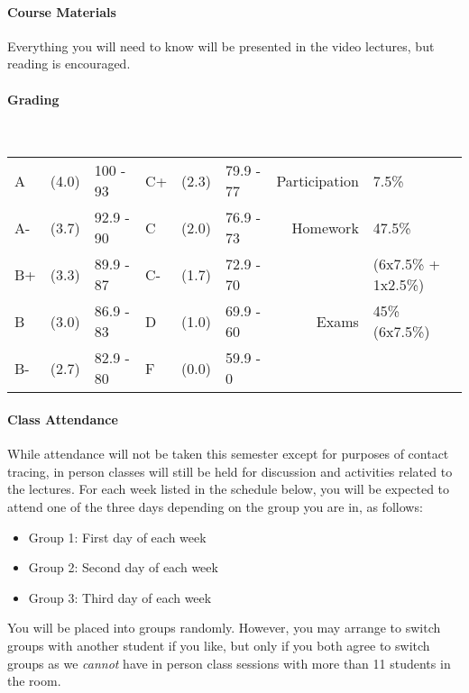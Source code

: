 \documentclass{article}
\begin{document}
  \paragraph{Course Materials}
    Everything you will need to know will be presented in the video lectures, but reading is encouraged.

  \paragraph{Grading} \mbox{}\\
    {\small
      \begin{tabular}{@{} l @{} l l l @{} l l | r l @{}}
        A   & (4.0) & 100 - 93  & C+  & (2.3) & 79.9 - 77 & Participation & 7.5\%\\
        A-  & (3.7) & 92.9 - 90 & C   & (2.0) & 76.9 - 73 & Homework      & 47.5\%\\
        B+  & (3.3) & 89.9 - 87 & C-  & (1.7) & 72.9 - 70 &               & (6x7.5\% + 1x2.5\%)\\
        B   & (3.0) & 86.9 - 83 & D   & (1.0) & 69.9 - 60 & Exams         & 45\% (6x7.5\%)\\
        B-  & (2.7) & 82.9 - 80 & F   & (0.0) & 59.9 - 0  &               &
      \end{tabular}
    }

  \paragraph{Class Attendance}
    While attendance will not be taken this semester except for purposes of contact tracing, in person classes will still be held for discussion and activities related to the lectures.
    For each week listed in the schedule below, you will be expected to attend one of the three days depending on the group you are in, as follows:
    \begin{itemize}
      \item Group 1: First day of each week
      \item Group 2: Second day of each week
      \item Group 3: Third day of each week
    \end{itemize}
    You will be placed into groups randomly.
    However, you may arrange to switch groups with another student if you like, but only if you both agree to switch groups as we \emph{cannot} have in person class sessions with more than 11 students in the room.
\end{document}
